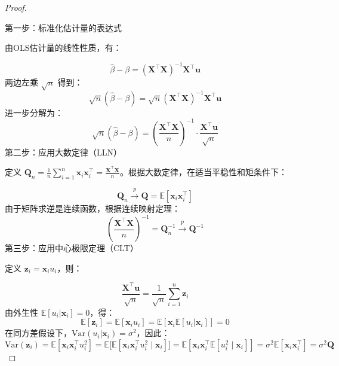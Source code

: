 \begin{proof}
\begin{flushleft}
第一步：标准化估计量的表达式
\end{flushleft}
\begin{flushleft}
由OLS估计量的线性性质，有：
\end{flushleft}
\begin{equation}
\hat{\beta} - \beta = (\mathbf{X}^\top \mathbf{X})^{-1} \mathbf{X}^\top \mathbf{u}
\end{equation}
两边左乘 $\sqrt{n}$ 得到：
\begin{equation}
\sqrt{n}(\hat{\beta} - \beta) = \sqrt{n} (\mathbf{X}^\top \mathbf{X})^{-1} \mathbf{X}^\top \mathbf{u}
\end{equation}
进一步分解为：
\begin{equation}
\sqrt{n}(\hat{\beta} - \beta) = \left( \frac{\mathbf{X}^\top \mathbf{X}}{n} \right)^{-1} \cdot \frac{\mathbf{X}^\top \mathbf{u}}{\sqrt{n}}
\end{equation}
第二步：应用大数定律（LLN）
\begin{flushleft}
定义 $\mathbf{Q}_n = \frac{1}{n} \sum_{i=1}^n \mathbf{x}_i \mathbf{x}_i^\top = \frac{\mathbf{X}^\top \mathbf{X}}{n}$。根据大数定律，在适当平稳性和矩条件下：
\end{flushleft}
\begin{equation}
\mathbf{Q}_n \overset{p}{\to} \mathbf{Q} = \mathbb{E}[\mathbf{x}_i \mathbf{x}_i^\top]
\end{equation}
由于矩阵求逆是连续函数，根据连续映射定理：
\begin{equation}
\left( \frac{\mathbf{X}^\top \mathbf{X}}{n} \right)^{-1} = \mathbf{Q}_n^{-1} \overset{p}{\to} \mathbf{Q}^{-1}
\end{equation}
第三步：应用中心极限定理（CLT）
\begin{flushleft}
定义 $\mathbf{z}_i = \mathbf{x}_i u_i$，则：
\end{flushleft}
\begin{equation}
\frac{\mathbf{X}^\top \mathbf{u}}{\sqrt{n}} = \frac{1}{\sqrt{n}} \sum_{i=1}^n \mathbf{z}_i
\end{equation}
由外生性 $\mathbb{E}[u_i|\mathbf{x}_i] = 0$，得：
\begin{equation}
\mathbb{E}[\mathbf{z}_i] = \mathbb{E}[\mathbf{x}_i u_i] = \mathbb{E}[\mathbf{x}_i \mathbb{E}[u_i|\mathbf{x}_i]] = 0
\end{equation}
在同方差假设下，$\text{Var}(u_i|\mathbf{x}_i) = \sigma^2$，因此：
\begin{equation}
\text{Var}(\mathbf{z}_i) = \mathbb{E}[\mathbf{x}_i \mathbf{x}_i^\top u_i^2] = \mathbb{E}\big[\mathbb{E}[\mathbf{x}_i \mathbf{x}_i^\top u_i^2 \mid \mathbf{x}_i]\big] = \mathbb{E}[\mathbf{x}_i \mathbf{x}_i^\top \mathbb{E}[u_i^2 \mid \mathbf{x}_i]] = \sigma^2 \mathbb{E}[\mathbf{x}_i \mathbf{x}_i^\top] = \sigma^2 \mathbf{Q}

\end{equation}
\end{proof}
